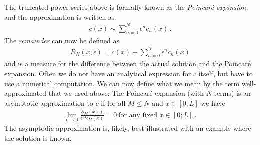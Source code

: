 The truncated power series above is formally known as the \emph{Poincar\'{e} expansion}, and the 
approximation is written as
\begin{eqnarray}
	c(x) \sim \sum_{n=0}^N \epsilon^n c_n(x)  \, .
\end{eqnarray}
The \emph{remainder} can now be defined as 
\begin{eqnarray}
	R_N(x,\epsilon) = c(x) - \sum_{n=0}^N \epsilon^n c_n(x)  
\end{eqnarray}
and is a measure for the difference between the actual solution and the Poincar\'{e} expansion. Often 
we do not have an analytical expression for $c$ itself, but have to use a numerical computation. 
We can now define what we mean by the term well-approximated that we used 
above: The Poincar\'{e} expansion (with $N$ terms) is an asymptotic approximation to $c$ if for
all $M\leq N$ and $x \in [0; L]$ we have
\begin{eqnarray}
	\lim_{\epsilon \rightarrow 0}	\frac{R_M(x, \epsilon)}{\epsilon^M c_M(x)} = 0  \ 
	\text{for any fixed $x \in [0;L]$} \ .
	\label{eq:asymappr}
\end{eqnarray}
The asymptodic approximation is, likely, 
best illustrated with an example where the solution is known. 
